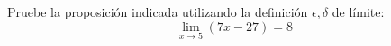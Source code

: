 \setcounter{enumi}{24}
\item Pruebe la proposición indicada utilizando la definición $\epsilon, \delta$ de límite:
$$\lim_{x \to 5} (7x - 27) = 8$$
